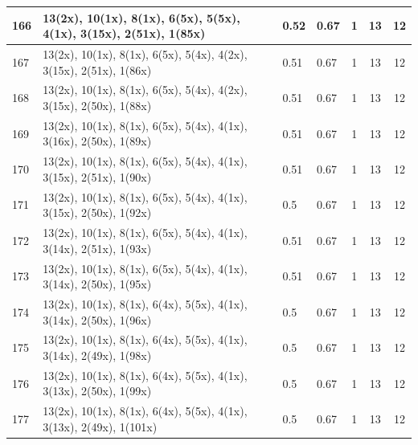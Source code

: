 \begin{small}
\begin{longtable}{|p{0.5cm}|p{9cm}|p{1.3cm}|p{1.3cm}|c|c|c|}
  166 & 13(2x), 10(1x), 8(1x), 6(5x), 5(5x), 4(1x), 3(15x), 2(51x), 1(85x) & \cellcolor{colorGood}  0.52 & \cellcolor{colorGood} 0.67 & 1 & 13 & \cellcolor{colorGood} 12 \\   \hline
  167 & 13(2x), 10(1x), 8(1x), 6(5x), 5(4x), 4(2x), 3(15x), 2(51x), 1(86x) & \cellcolor{colorGood}  0.51 & \cellcolor{colorGood} 0.67 & 1 & 13 & \cellcolor{colorGood} 12 \\   \hline
  168 & 13(2x), 10(1x), 8(1x), 6(5x), 5(4x), 4(2x), 3(15x), 2(50x), 1(88x) & \cellcolor{colorGood}  0.51 & \cellcolor{colorGood} 0.67 & 1 & 13 & \cellcolor{colorGood} 12 \\   \hline
  169 & 13(2x), 10(1x), 8(1x), 6(5x), 5(4x), 4(1x), 3(16x), 2(50x), 1(89x) & \cellcolor{colorGood}  0.51 & \cellcolor{colorGood} 0.67 & 1 & 13 & \cellcolor{colorGood} 12 \\   \hline
  170 & 13(2x), 10(1x), 8(1x), 6(5x), 5(4x), 4(1x), 3(15x), 2(51x), 1(90x) & \cellcolor{colorGood}  0.51 & \cellcolor{colorGood} 0.67 & 1 & 13 & \cellcolor{colorGood} 12 \\   \hline
  171 & 13(2x), 10(1x), 8(1x), 6(5x), 5(4x), 4(1x), 3(15x), 2(50x), 1(92x) & \cellcolor{colorGood}  0.5 & \cellcolor{colorGood} 0.67 & 1 & 13 & \cellcolor{colorGood} 12 \\   \hline
  172 & 13(2x), 10(1x), 8(1x), 6(5x), 5(4x), 4(1x), 3(14x), 2(51x), 1(93x) & \cellcolor{colorGood}  0.51 & \cellcolor{colorGood} 0.67 & 1 & 13 & \cellcolor{colorGood} 12 \\   \hline
  173 & 13(2x), 10(1x), 8(1x), 6(5x), 5(4x), 4(1x), 3(14x), 2(50x), 1(95x) & \cellcolor{colorGood}  0.51 & \cellcolor{colorGood} 0.67 & 1 & 13 & \cellcolor{colorGood} 12 \\   \hline
  174 & 13(2x), 10(1x), 8(1x), 6(4x), 5(5x), 4(1x), 3(14x), 2(50x), 1(96x) & \cellcolor{colorGood}  0.5 & \cellcolor{colorGood} 0.67 & 1 & 13 & \cellcolor{colorGood} 12 \\   \hline
  175 & 13(2x), 10(1x), 8(1x), 6(4x), 5(5x), 4(1x), 3(14x), 2(49x), 1(98x) & \cellcolor{colorGood}  0.5 & \cellcolor{colorGood} 0.67 & 1 & 13 & \cellcolor{colorGood} 12 \\   \hline
  176 & 13(2x), 10(1x), 8(1x), 6(4x), 5(5x), 4(1x), 3(13x), 2(50x), 1(99x) & \cellcolor{colorGood}  0.5 & \cellcolor{colorGood} 0.67 & 1 & 13 & \cellcolor{colorGood} 12 \\   \hline
  177 & 13(2x), 10(1x), 8(1x), 6(4x), 5(5x), 4(1x), 3(13x), 2(49x), 1(101x) & \cellcolor{colorGood}  0.5 & \cellcolor{colorGood} 0.67 & 1 & 13 & \cellcolor{colorGood} 12 \\   \hline

\end{longtable}
\end{small}
